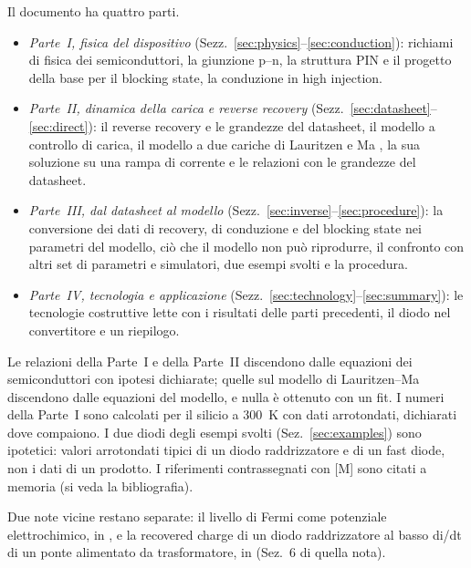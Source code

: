 \documentclass[10pt,a4paper]{scrartcl}
\begin{document}
Il documento ha quattro parti.
\begin{itemize}
\item \emph{Parte~I, fisica del dispositivo} (Sezz.~\ref{sec:physics}--\ref{sec:conduction}): richiami di fisica dei semiconduttori, la giunzione p--n, la struttura PIN e il progetto della base per il blocking state, la conduzione in high injection.
\item \emph{Parte~II, dinamica della carica e reverse recovery} (Sezz.~\ref{sec:datasheet}--\ref{sec:direct}): il reverse recovery e le grandezze del datasheet, il modello a controllo di carica, il modello a due cariche di Lauritzen e Ma \cite{lauritzen1991}, la sua soluzione su una rampa di corrente e le relazioni con le grandezze del datasheet.
\item \emph{Parte~III, dal datasheet al modello} (Sezz.~\ref{sec:inverse}--\ref{sec:procedure}): la conversione dei dati di recovery, di conduzione e del blocking state nei parametri del modello, ciò che il modello non può riprodurre, il confronto con altri set di parametri e simulatori, due esempi svolti e la procedura.
\item \emph{Parte~IV, tecnologia e applicazione} (Sezz.~\ref{sec:technology}--\ref{sec:summary}): le tecnologie costruttive lette con i risultati delle parti precedenti, il diodo nel convertitore e un riepilogo.
\end{itemize}
Le relazioni della Parte~I e della Parte~II discendono dalle equazioni dei semiconduttori con ipotesi dichiarate; quelle sul modello di Lauritzen--Ma discendono dalle equazioni del modello, e nulla è ottenuto con un fit. I numeri della Parte~I sono calcolati per il silicio a \SI{300}{\kelvin} con dati arrotondati, dichiarati dove compaiono. I due diodi degli esempi svolti (Sez.~\ref{sec:examples}) sono ipotetici: valori arrotondati tipici di un diodo raddrizzatore e di un fast diode, non i dati di un prodotto. I riferimenti contrassegnati con [M] sono citati a memoria (si veda la bibliografia).

Due note vicine restano separate: il livello di Fermi come potenziale elettrochimico, in {\def\UrlBreaks{\do\/\do\_}}, e la recovered charge di un diodo raddrizzatore al basso di/dt di un ponte alimentato da trasformatore, in  (Sez.~6 di quella nota).
\end{document}
